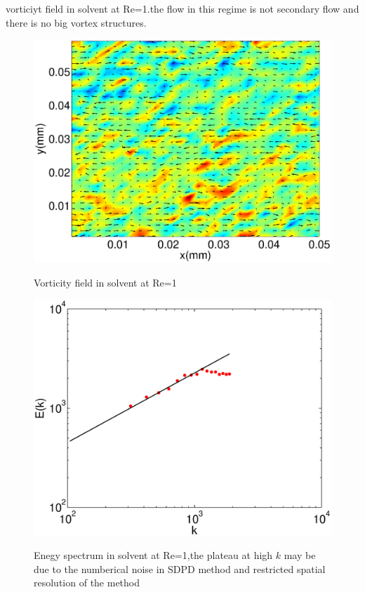 \documentclass[aps,prl,twocolumn,showpacs,superscriptaddress,groupedaddress]{revtex4}  %
\begin{document}
vorticiyt field in solvent at Re=1.the flow in this regime is not secondary flow and there is no big vortex structures.\\
\begin{figure}
 \includegraphics[scale=0.35]{vorsols}
\label{fig:vorsols}
\caption{Vorticity field in solvent at Re=1}
\end{figure} 
\begin{figure}
 \includegraphics[scale=0.35]{spesols}
\label{fig:spesols}
\caption{Enegy spectrum in solvent at Re=1,the plateau at high $k$ may be due to the numberical noise in SDPD method and restricted spatial resolution of the method}
\end{figure} 
\end{document}
